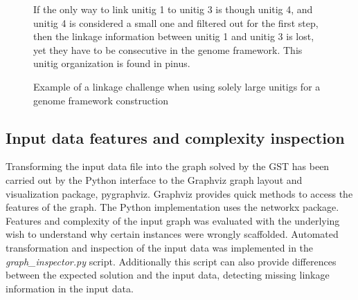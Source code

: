 \documentclass[12pt]{article}
\begin{document}
\begin{figure}[h!]
\begin{center}
\end{center}
\caption{Example of a linkage challenge when using solely large unitigs for a genome framework construction}
{\footnotesize If the only way to link unitig 1 to unitig 3 is though unitig 4, and unitig 4 is considered a small one and filtered out for the first step, then the linkage information between unitig 1 and unitig 3 is lost, yet they have to be consecutive in the genome framework. This unitig organization is found in pinus.}
\label{fig:flowlinkage}
\end{figure}


\subsection{Input data features and complexity inspection}
Transforming the input data file into the graph solved by the GST has been carried out by the Python interface to the Graphviz graph layout and visualization package, pygraphviz. Graphviz provides quick methods to access the features of the graph. The Python implementation uses the networkx package. Features and complexity of the input graph was evaluated with the underlying wish to understand why certain instances were wrongly scaffolded. Automated transformation and inspection of the input data was implemented in the \textit{graph\_inspector.py} script. Additionally this script can also provide differences between the expected solution and the input data, detecting missing linkage information in the input data.
\end{document}
